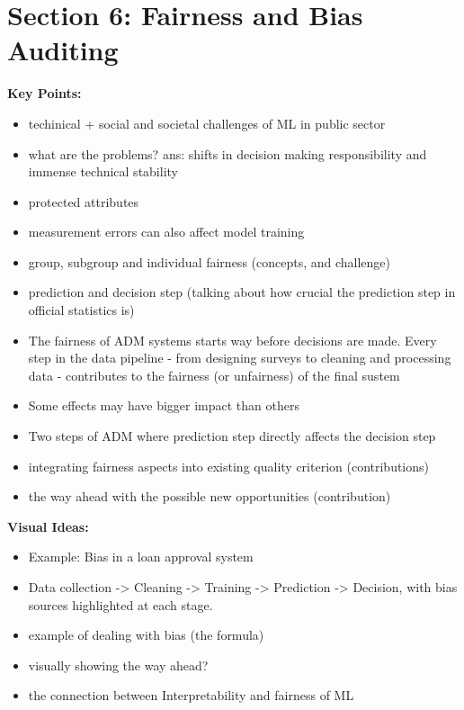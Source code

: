 \documentclass[a4paper,12pt]{article}
\begin{document}
\section{Section 6: Fairness and Bias Auditing}
\textbf{Key Points:}
\begin{itemize}[label=\textbullet, leftmargin=1cm]
    \item techinical + social and societal challenges of ML in public sector
    \item what are the problems? ans: shifts in decision making responsibility and immense technical stability
    \item protected attributes
    \item measurement errors can also affect model training
    \item group, subgroup and individual fairness (concepts, and challenge)
    \item prediction and decision step (talking about how crucial the prediction step in official statistics is)
    \item The fairness of ADM systems starts way before decisions are made. Every step in the data pipeline - from designing surveys to cleaning and processing data - contributes to the fairness (or unfairness) of the final sustem
    \item Some effects may have bigger impact than others
    \item Two steps of ADM where prediction step directly affects the decision step
    \item integrating fairness aspects into existing quality criterion (contributions)
    \item the way ahead with the possible new opportunities (contribution)
\end{itemize}

\textbf{Visual Ideas:}
\begin{itemize}[label=$\star$, leftmargin=1cm]
    \item Example: Bias in a loan approval system 
    \item Data collection -> Cleaning -> Training -> Prediction -> Decision, with bias sources highlighted at each stage.
    \item example of dealing with bias (the formula)
    \item visually showing the way ahead? 
    \item the connection between Interpretability and fairness of ML
\end{itemize}
\end{document}
